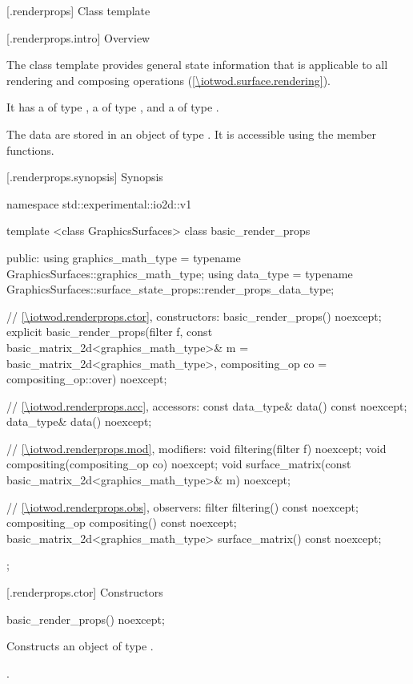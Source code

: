 
 [\iotwod.renderprops] {Class template }

 [\iotwod.renderprops.intro] {Overview}

\pnum
The  class template provides general state information that is applicable to all rendering and composing operations (\ref{\iotwod.surface.rendering}).

\pnum
It has a  of type , a  of type , and a  of type .

\pnum
The data are stored in an object of type . It is accessible using the  member functions.

 [\iotwod.renderprops.synopsis] {Synopsis}

\begin{codeblock}
namespace std::experimental::io2d::v1 {
  template <class GraphicsSurfaces>
  class basic_render_props {
  public:
    using graphics_math_type = typename GraphicsSurfaces::graphics_math_type;
    using data_type =
      typename GraphicsSurfaces::surface_state_props::render_props_data_type;

    // \ref{\iotwod.renderprops.ctor}, constructors:
    basic_render_props() noexcept;
    explicit basic_render_props(filter f,
      const basic_matrix_2d<graphics_math_type>& m = basic_matrix_2d<graphics_math_type>{},
      compositing_op co = compositing_op::over) noexcept;
    
    // \ref{\iotwod.renderprops.acc}, accessors:
    const data_type& data() const noexcept;
    data_type& data() noexcept;

    // \ref{\iotwod.renderprops.mod}, modifiers:
    void filtering(filter f) noexcept;
    void compositing(compositing_op co) noexcept;
    void surface_matrix(const basic_matrix_2d<graphics_math_type>& m) noexcept;

    // \ref{\iotwod.renderprops.obs}, observers:
    filter filtering() const noexcept;
    compositing_op compositing() const noexcept;
    basic_matrix_2d<graphics_math_type> surface_matrix() const noexcept;
  };
}
\end{codeblock}

 [\iotwod.renderprops.ctor] {Constructors}

\begin{itemdecl}
basic_render_props() noexcept;
\end{itemdecl}
\begin{itemdescr}
\pnum
\effects
Constructs an object of type .

\pnum
\postconditions
{}.
\end{itemdescr}

